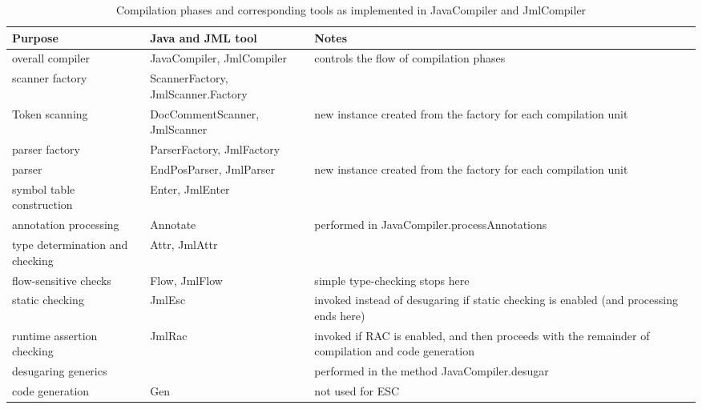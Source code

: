 \documentclass{report}%
\begin{document}
\begin{table}
\begin{tabularx}{\textwidth}{|p{1.5in}|p{1.5in}|X|}

\hline
Purpose & Java and JML tool &  Notes \\
\hline
overall compiler & JavaCompiler, JmlCompiler & controls the flow of compilation phases \\
\hline
scanner factory & ScannerFactory, JmlScanner.Factory  & \\
\hline
Token scanning & DocCommentScanner, JmlScanner &  new instance created from the factory for each compilation unit \\
\hline
parser factory & ParserFactory, JmlFactory  & \\
\hline
parser & EndPosParser, JmlParser & new instance created from the factory for each compilation unit \\
\hline
symbol table construction & Enter, JmlEnter & \\
\hline
annotation processing & Annotate & performed in JavaCompiler.processAnnotations\\
\hline
type determination and checking & Attr, JmlAttr & \\
\hline
flow-sensitive checks & Flow, JmlFlow & simple type-checking stops here \\
\hline
\hline
static checking & JmlEsc & invoked instead of desugaring if static checking is enabled (and processing ends here) \\
\hline
\hline
runtime assertion checking & JmlRac & invoked if RAC is enabled, and then proceeds with the remainder of compilation and code generation \\
\hline
desugaring generics & & performed in the method JavaCompiler.desugar \\
\hline
code generation & Gen & not used for ESC \\
\hline


\end{tabularx}
\caption{Compilation phases and corresponding tools as implemented in JavaCompiler and JmlCompiler}
\label{Tools1}
\end{table}
\end{document}
